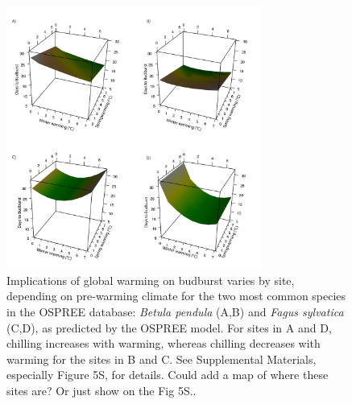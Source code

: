 \documentclass{article}
\begin{document}
\begin{figure}[h!]
\centering
\noindent \includegraphics[width=0.75\textwidth]{..//..//analyses/bb_analysis/figures/forecasting/bbmod_3dplot_utah_obs.pdf}
\caption{Implications of global warming on budburst varies by site, depending on pre-warming climate for the two most common species in the OSPREE database: \emph{Betula pendula} (A,B) and \emph{Fagus sylvatica} (C,D), as predicted by the OSPREE model. For sites in A and D, chilling increases with warming, whereas chilling decreases with warming for the sites in B and C. See Supplemental Materials, especially Figure 5S, for details. Could add a map of where these sites are? Or just show on the Fig 5S..}
\label{fig:fore}
\end{figure}






\end{document}
